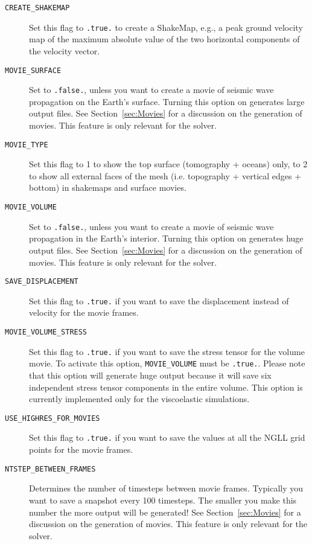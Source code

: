 \vspace{1cm}
\begin{description}
\item [{\texttt{CREATE\_SHAKEMAP}}] Set this flag to \texttt{.true.} to
create a ShakeMap\textregistered{}, e.g., a peak ground velocity map
of the maximum absolute value of the two horizontal components of
the velocity vector.
\item [{\texttt{MOVIE\_SURFACE}}] Set to \texttt{.false.}, unless you want
to create a movie of seismic wave propagation on the Earth's surface.
Turning this option on generates large output files. See Section~\ref{sec:Movies}
for a discussion on the generation of movies. This feature is only
relevant for the solver.
\item [{\texttt{MOVIE\_TYPE}}] Set this flag to 1 to show the top surface
(tomography + oceans) only, to 2 to show all external faces of the
mesh (i.e. topography + vertical edges + bottom) in shakemaps and
surface movies.
\item [{\texttt{MOVIE\_VOLUME}}] Set to \texttt{.false.}, unless you want
to create a movie of seismic wave propagation in the Earth's interior.
Turning this option on generates huge output files. See Section~\ref{sec:Movies}
for a discussion on the generation of movies. This feature is only
relevant for the solver.
\item [{\texttt{SAVE\_DISPLACEMENT}}] Set this flag to \texttt{.true.}
if you want to save the displacement instead of velocity for the movie
frames.
\item [{\texttt{MOVIE\_VOLUME\_STRESS}}] Set this flag to \texttt{.true.}
if you want to save the stress tensor for the volume movie. To activate this option, \texttt{MOVIE\_VOLUME} must be \texttt{.true.}. Please note that this option will generate huge output because it will save six independent stress tensor components in the entire volume. This option is currently implemented only for the viscoelastic simulations.
\item [{\texttt{USE\_HIGHRES\_FOR\_MOVIES}}] Set this flag to \texttt{.true.}
if you want to save the values at all the NGLL grid points for the
movie frames.
\item [{\texttt{NTSTEP\_BETWEEN\_FRAMES}}] Determines the number of timesteps
between movie frames. Typically you want to save a snapshot every
100 timesteps. The smaller you make this number the more output will
be generated! See Section~\ref{sec:Movies} for a discussion on the
generation of movies. This feature is only relevant for the solver.

\end{description}
